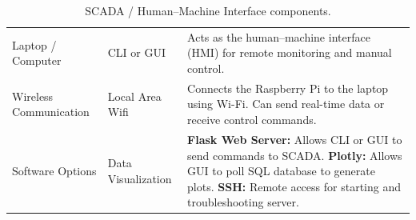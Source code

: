  
\begin{table}[p]
  \centering
  \footnotesize
  \renewcommand{\arraystretch}{1.4}
  \setlength{\tabcolsep}{5pt}
  \caption{SCADA / Human--Machine Interface components.}
  \label{tab:scada}
  \begin{tabular}{|P{2.4cm}|P{2.4cm}|P{11cm}|}
    \hline
      & 
      &  \\
    \hline
    Laptop / Computer
      & CLI or GUI
      & Acts as the human--machine interface (HMI) for remote
        monitoring and manual control. \\
    \hline
    Wireless Communication
      & Local Area Wifi
      & Connects the Raspberry Pi to the laptop using Wi-Fi.
        Can send real-time data or receive control commands. \\
    \hline
    Software Options
      & Data Visualization
      & \textbf{Flask Web Server:} Allows CLI or GUI to send commands to SCADA.
        \textbf{Plotly:} Allows GUI to poll SQL database to generate plots.
        \textbf{SSH:} Remote access for starting and troubleshooting server.\\
    \hline
  \end{tabular}
\end{table}
 
